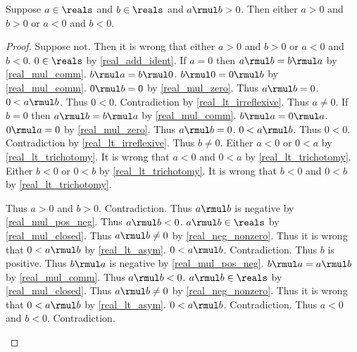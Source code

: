 \begin{theorem}\label{real_mul_pos_same_sign_rev}
    Suppose $a\in\reals$ and $b\in\reals$ and $a \rmul b > 0$.
    Then either $a > 0$ and $b > 0$ or $a < 0$ and $b < 0$.
\end{theorem}
\begin{proof}
    Suppose not.
    Then it is wrong that either $a > 0$ and $b > 0$ or $a < 0$ and $b < 0$.
    $0\in\reals$ by \cref{real_add_ident}.
    If $a = 0$ then
        $a \rmul b = b \rmul a$ by \cref{real_mul_comm}.
        $b \rmul a = b \rmul 0$.
        $b \rmul 0 = 0 \rmul b$ by \cref{real_mul_comm}.
        $0 \rmul b = 0$ by \cref{real_mul_zero}.
        Thus $a \rmul b = 0$.
        $0 < a \rmul b$.
        Thus $0 < 0$.
        Contradiction by \cref{real_lt_irreflexive}.
    Thus $a \neq 0$.
    If $b = 0$ then
        $a \rmul b = b \rmul a$ by \cref{real_mul_comm}.
        $b \rmul a = 0 \rmul a$.
        $0 \rmul a = 0$ by \cref{real_mul_zero}.
        Thus $a \rmul b = 0$.
        $0 < a \rmul b$.
        Thus $0 < 0$.
        Contradiction by \cref{real_lt_irreflexive}.
    Thus $b \neq 0$.
    Either $a < 0$ or $0 < a$ by \cref{real_lt_trichotomy}.
    It is wrong that $a < 0$ and $0 < a$ by \cref{real_lt_trichotomy}.
    Either $b < 0$ or $0 < b$ by \cref{real_lt_trichotomy}.
    It is wrong that $b < 0$ and $0 < b$ by \cref{real_lt_trichotomy}.
    \begin{byCase}
        Thus $a > 0$ and $b > 0$.
        Contradiction.
        Thus $a \rmul b$ is negative by \cref{real_mul_pos_neg}.
        Thus $a \rmul b < 0$.
        $a \rmul b\in\reals$ by \cref{real_mul_closed}.
        Thus $a \rmul b \neq 0$ by \cref{real_neg_nonzero}.
        Thus it is wrong that $0 < a \rmul b$ by \cref{real_lt_asym}.
        $0 < a \rmul b$.
        Contradiction.
        Thus $b$ is positive.
        Thus $b \rmul a$ is negative by \cref{real_mul_pos_neg}.
        $b \rmul a = a \rmul b$ by \cref{real_mul_comm}.
        Thus $a \rmul b < 0$.
        $a \rmul b\in\reals$ by \cref{real_mul_closed}.
        Thus $a \rmul b \neq 0$ by \cref{real_neg_nonzero}.
        Thus it is wrong that $0 < a \rmul b$ by \cref{real_lt_asym}.
        $0 < a \rmul b$.
        Contradiction.
        Thus $a < 0$ and $b < 0$.
        Contradiction.
    \end{byCase}
\end{proof}

